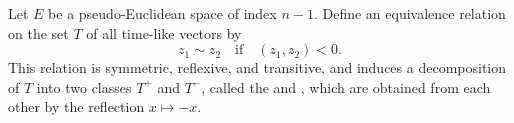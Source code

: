 Let $E$ be a pseudo-Euclidean space of index $n-1$. Define an equivalence relation on the set $T$ of all time-like vectors by
$$z_1 \sim z_2 \quad \text{if} \quad (z_1, z_2) < 0.$$
This relation is symmetric, reflexive, and transitive, and induces a decomposition of $T$ into two classes $T^+$ and $T^-$, called the  and , which are obtained from each other by the reflection $x \mapsto -x$.
